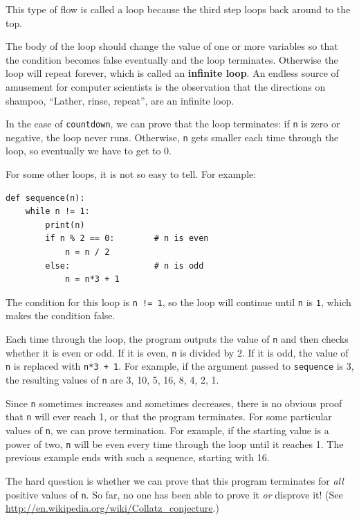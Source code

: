 \documentclass[10pt]{book}
\begin{document}
This type of flow is called a loop because the third step
loops back around to the top.

The body of the loop should change the value of one or more variables
so that the condition becomes false eventually and the loop
terminates.  Otherwise the loop will repeat forever, which is called
an {\bf infinite loop}.  An endless source of amusement for computer
scientists is the observation that the directions on shampoo,
``Lather, rinse, repeat'', are an infinite loop.

In the case of {\tt countdown}, we can prove that the loop
terminates: if {\tt n} is zero or negative, the loop never runs.
Otherwise, {\tt n} gets smaller each time through the
loop, so eventually we have to get to 0.

For some other loops, it is not so easy to tell.  For example:

\begin{verbatim}
def sequence(n):
    while n != 1:
        print(n)
        if n % 2 == 0:        # n is even
            n = n / 2
        else:                 # n is odd
            n = n*3 + 1
\end{verbatim}
%
The condition for this loop is {\tt n != 1}, so the loop will continue
until {\tt n} is {\tt 1}, which makes the condition false.

Each time through the loop, the program outputs the value of {\tt n}
and then checks whether it is even or odd.  If it is even, {\tt n} is
divided by 2.  If it is odd, the value of {\tt n} is replaced with
{\tt n*3 + 1}. For example, if the argument passed to {\tt sequence}
is 3, the resulting values of {\tt n} are 3, 10, 5, 16, 8, 4, 2, 1.

Since {\tt n} sometimes increases and sometimes decreases, there is no
obvious proof that {\tt n} will ever reach 1, or that the program
terminates.  For some particular values of {\tt n}, we can prove
termination.  For example, if the starting value is a power of two,
{\tt n} will be even every time through the loop
until it reaches 1. The previous example ends with such a sequence,
starting with 16.

The hard question is whether we can prove that this program terminates
for {\em all} positive values of {\tt n}.  So far, no one has
been able to prove it {\em or} disprove it!  (See
  \url{http://en.wikipedia.org/wiki/Collatz_conjecture}.)
\end{document}
